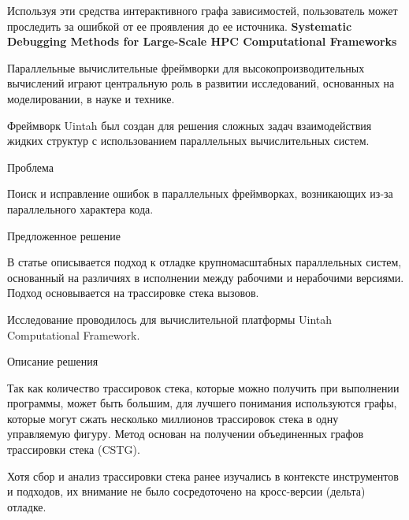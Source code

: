 Используя эти средства интерактивного графа зависимостей, пользователь может проследить за ошибкой от ее проявления до ее источника.
\newline\newline
\textbf{Systematic Debugging Methods for Large-Scale HPC Computational Frameworks}
\newline

Параллельные вычислительные фреймворки для высокопроизводительных вычислений играют центральную роль в развитии исследований, основанных на моделировании, в науке и технике.

Фреймворк Uintah был создан для решения сложных задач взаимодействия жидких структур с использованием параллельных вычислительных систем.
\newline
 
Проблема

Поиск и исправление ошибок в параллельных фреймворках, возникающих из-за параллельного характера кода.
\newline

Предложенное решение

В статье описывается подход к отладке крупномасштабных параллельных систем, основанный на различиях в исполнении между рабочими и нерабочими версиями. Подход основывается на трассировке стека вызовов.

Исследование проводилось для вычислительной платформы Uintah Computational Framework.
\newline

Описание решения

Так как количество трассировок стека, которые можно получить при выполнении программы, может быть большим, для лучшего понимания используются графы, которые могут сжать несколько миллионов трассировок стека в одну управляемую фигуру. Метод основан на получении объединенных графов трассировки стека (CSTG). 

Хотя сбор и анализ трассировки стека ранее изучались в контексте инструментов и подходов, их внимание не было сосредоточено на кросс-версии (дельта) отладке.

